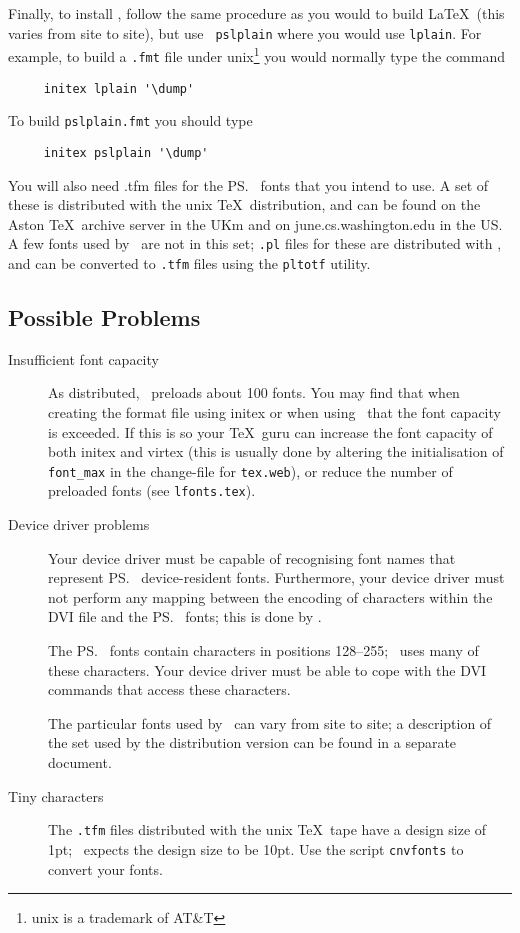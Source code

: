 Finally, to install \pslatex, follow the same procedure as you would
to build \LaTeX\ (this varies from site to site), but use {\tt
pslplain} where you would use {\tt lplain}.  For example, to build a
{\tt .fmt} file under {\sc unix}\footnote{{\sc unix} is a trademark of
AT\&T} you would normally type the command
\begin{verbatim}
     initex lplain '\dump'
\end{verbatim}
To build {\tt pslplain.fmt} you should type
\begin{verbatim}
     initex pslplain '\dump'
\end{verbatim}

You will also need {\sc .tfm} files for the \ps\ fonts that you intend
to use.  A set of these is distributed with the {\sc unix} \TeX\
distribution, and can be found on the Aston \TeX\ archive server in
the UKm and on june.cs.washington.edu in the US.  A few fonts used by
\pslatex\ are not in this set; {\tt .pl} files for these are
distributed with \pslatex, and can be converted to {\tt .tfm} files
using the {\tt pltotf} utility.

\subsection{Possible Problems}

\begin{description}
\item[Insufficient font capacity]
	As distributed, \pslatex\ preloads about 100 fonts.  You may
	find that when creating the format file using {\sc initex} or
	when using \pslatex\ that the font capacity is exceeded.  If
	this is so your \TeX\ guru can increase the font capacity of
	both {\sc initex} and {\sc virtex} (this is usually done by
	altering the initialisation of {\tt font\_max} in the
	change-file for {\tt tex.web}), or reduce the number of
	preloaded fonts (see {\tt lfonts.tex}).
\item[Device driver problems]
	Your device driver must be capable of recognising font names
	that represent \ps\ device-resident fonts.   Furthermore, your
	device driver must not perform any mapping between the
	encoding of characters within the DVI file and the \ps\ fonts;
	this is done by \pslatex.
	
	The \ps\ fonts contain characters in positions 128--255;
	\pslatex\ uses many of these characters.  Your device driver
	must be able to cope with the DVI commands that access these
	characters. 

	The particular fonts used by \pslatex\ can vary from site to
	site; a description of the set used by the distribution
	version can be found in a separate document.
\item[Tiny characters]
	The {\tt .tfm} files distributed with the {\sc unix} \TeX\
	tape have a design size of 1pt; \pslatex\ expects the design
	size to be 10pt.  Use the script {\tt cnvfonts} to convert
	your fonts.
\end{description}

